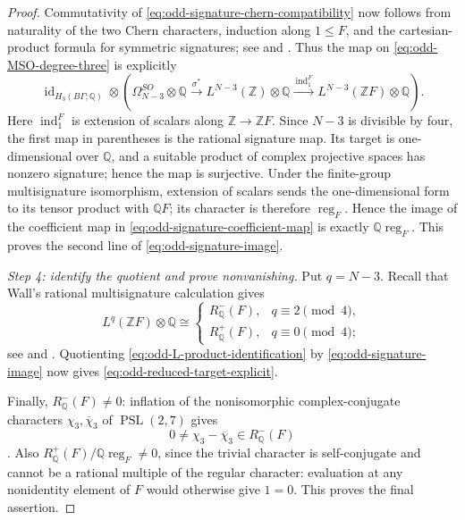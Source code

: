 \documentclass[10pt,reqno]{amsart}
\numberwithin{equation}{section}
\theoremstyle{definition}
\theoremstyle{remark}
\newcommand{\Z}{\mathbb Z}
\newcommand{\Q}{\mathbb Q}
\newcommand{\PSL}{\operatorname{PSL}}
\begin{document}
\begin{proof}
Commutativity of \eqref{eq:odd-signature-chern-compatibility} now follows
from naturality of the two Chern characters, induction along
\(1\leq F\), and the cartesian-product formula for symmetric
signatures; see \cite[Theorem~178]{LueckReich} and
\cite[Proposition~8.1(i)]{RanickiSurgeryII}.  Thus the map on
\eqref{eq:odd-MSO-degree-three} is explicitly
\begin{equation}\label{eq:odd-signature-coefficient-map}
\operatorname{id}_{H_3(B\Gamma;\Q)}
\otimes
\left(
\Omega_{N-3}^{SO}\otimes\Q
\xrightarrow{\ \sigma^*\ }
L^{N-3}(\Z)\otimes\Q
\xrightarrow{\ \operatorname{ind}_1^F\ }
L^{N-3}(\Z F)\otimes\Q
\right).
\end{equation}
Here \(\operatorname{ind}_1^F\) is extension of scalars along
\(\Z\to\Z F\).  Since \(N-3\) is divisible by four, the first map in
parentheses is the rational signature map.  Its target is
one-dimensional over \(\Q\), and a suitable product of complex
projective spaces has nonzero signature; hence the map is surjective.
Under the finite-group multisignature isomorphism,
extension of scalars sends the one-dimensional form to its tensor
product with \(\Q F\); its character is therefore
\(\operatorname{reg}_F\).  Hence the image of the coefficient map in
\eqref{eq:odd-signature-coefficient-map} is exactly
\(\Q\operatorname{reg}_F\).  This proves the second line of
\eqref{eq:odd-signature-image}.

\smallskip
\noindent
\emph{Step 4: identify the quotient and prove nonvanishing.}
Put \(q=N-3\). Recall that Wall's rational multisignature calculation gives
\begin{equation}\label{eq:odd-finite-multisignature-detailed}
L^q(\Z F)\otimes\Q
\cong
\begin{cases}
R^-_{\Q}(F),&q\equiv2\pmod4,\\[1mm]
R^+_{\Q}(F),&q\equiv0\pmod4;
\end{cases}
\end{equation}
see \cite[Chapter~13A]{Wall} and \cite{Petrie}.  Quotienting
\eqref{eq:odd-L-product-identification} by
\eqref{eq:odd-signature-image} now gives
\eqref{eq:odd-reduced-target-explicit}.

Finally, \(R^-_{\Q}(F)\neq0\): inflation of the nonisomorphic
complex-conjugate characters \(\chi_3,\overline\chi_3\) of
\(\PSL(2,7)\) gives
\[
0\neq\chi_3-\overline\chi_3\in R^-_{\Q}(F)
\]
\cite{Atlas}.  Also
\(R^+_{\Q}(F)/\Q\operatorname{reg}_F\neq0\), since the trivial
character is self-conjugate and cannot be a rational multiple of the
regular character: evaluation at any nonidentity element of \(F\)
would otherwise give \(1=0\).  This proves the final assertion.
\end{proof}
\end{document}
